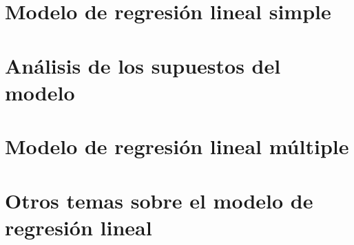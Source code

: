 \documentclass[8pt,a4paper]{extarticle}
\begin{document}
\begin{multicols}{3}
\newpage
\section{Modelo de regresión lineal simple}

\newpage
\section{Análisis de los supuestos del modelo}

\newpage
\section{Modelo de regresión lineal múltiple}

\newpage
\section{Otros temas sobre el modelo de regresión lineal}

\vfill\eject
\columnbreak
\end{multicols}
\end{document}
